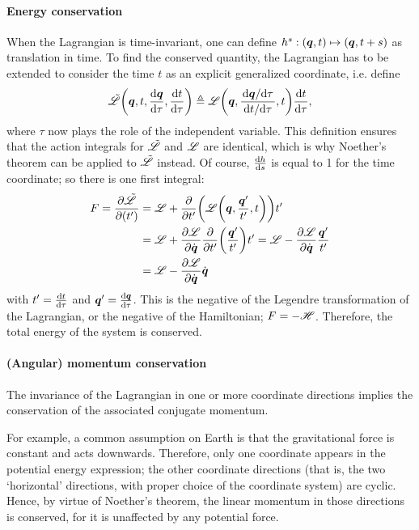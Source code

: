 \paragraph{Energy conservation} When the Lagrangian is time-invariant, one can define $h^s: (\vb*{q}, t) \mapsto (\vb*{q}, t + s)$ as translation in time. To find the conserved quantity, the Lagrangian has to be extended to consider the time $t$ as an explicit generalized coordinate, i.e. define
$$ \tilde{\mathscr{L}}\qty(\vb*{q}, t, \dv{\ensuremath{\vb*{q}}}{\tau}, \dv{t}{\tau}) \triangleq \mathscr{L}\qty(\vb*{q}, \frac{\dv*{\vb*{q}}{\tau}}{\dv*{t}{\tau}}, t)\dv{t}{\tau},$$
where $\tau$ now plays the role of the independent variable. This definition ensures that the action integrals for $\tilde{\mathscr{L}}$ and $\mathscr{L}$ are identical, which is why Noether's theorem can be applied to $\tilde{\mathscr{L}}$ instead. Of course, $\dv{h}{s}$ is equal to 1 for the time coordinate; so there is one first integral:
\begin{equation*}
    \begin{split}
        F = \pdv{\tilde{\ensuremath{\mathscr{L}}}}{(t')} 
        &= \mathscr{L} + \pdv{}{t'}\qty(\mathscr{L}\qty(\vb*{q}, \frac{
        \vb*{q}'}{t'}, t))t'\\
        &= \mathscr{L} + \pdv{\ensuremath{\mathscr{L}}}{\ensuremath{\dot{\vb*{q}}}}\pdv{}{t'}\qty(\frac{
        \vb*{q}'}{t'})t' = \mathscr{L} - \pdv{\ensuremath{\mathscr{L}}}{\ensuremath{\dot{\vb*{q}}}}\frac{\vb*{q}'}{t'}\\
        &= \mathscr{L} - \pdv{\ensuremath{\mathscr{L}}}{\ensuremath{\dot{\vb*{q}}}}\dot{\vb*{q}}
    \end{split}
\end{equation*}
with $t' = \dv{t}{\tau}$ and $\vb*{q}' = \dv{\ensuremath{\vb*{q}}}{\tau}$. This is the negative of the Legendre transformation of the Lagrangian, or the negative of the Hamiltonian; $F = -\mathscr{H}$. Therefore, the total energy of the system is conserved. 

\paragraph{(Angular) momentum conservation} The invariance of the Lagrangian in one or more coordinate directions implies the conservation of the associated conjugate momentum. 

For example, a common assumption on Earth is that the gravitational force is constant and acts downwards. Therefore, only one coordinate appears in the potential energy expression; the other coordinate directions (that is, the two `horizontal' directions, with proper choice of the coordinate system) are cyclic. Hence, by virtue of Noether's theorem, the linear momentum in those directions is conserved, for it is unaffected by any potential force.

